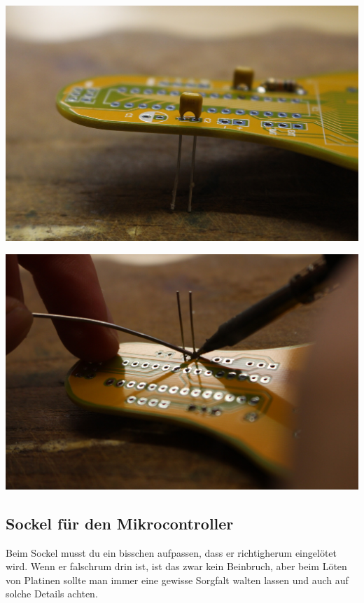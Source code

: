 \documentclass{article}
\begin{document}
\begin{minipage}[b]{0.5\textwidth}
	\includegraphics[width=\textwidth]{Bilder/IMG_5551.JPG}
\end{minipage}
\begin{minipage}[b]{0.5\textwidth}
	\includegraphics[width=\textwidth]{Bilder/IMG_5552.JPG}
\end{minipage}

\subsection{Sockel für den Mikrocontroller}

Beim Sockel musst du ein bisschen aufpassen, dass er richtigherum eingelötet wird. Wenn er falschrum drin ist, ist das zwar kein Beinbruch, aber beim Löten von Platinen sollte man immer eine gewisse Sorgfalt walten lassen und auch auf solche Details achten.
\end{document}
